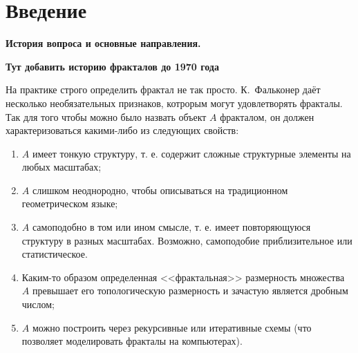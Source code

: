 \chapter*{Введение}                         %



\begin{center}
\textbf{История вопроса и основные направления.}
\end{center}
{\bf Тут добавить историю фракталов до 1970 года}


На практике строго определить фрактал не так просто.
К.~Фальконер \cite{Fal} даёт несколько необязательных признаков, котрорым могут удовлетворять фракталы.
Так для того чтобы можно было назвать объект $A$ фракталом, он должен характеризоваться какими-либо из следующих свойств:

\begin{enumerate}
\item $A$ имеет тонкую структуру, т. е. содержит сложные структурные элементы на любых масштабах;
\item $A$ слишком неоднородно, чтобы описываться на традиционном геометрическом языке;
\item $A$ самоподобно в том или ином смысле, т. е. имеет повторяющуюся структуру в разных масштабах. Возможно, самоподобие приблизительное или статистическое.
\item Каким-то образом определенная <<фрактальная>> размерность множества $A$ превышает его топологическую размерность и зачастую является дробным числом;
\item $A$ можно построить через рекурсивные или итеративные схемы (что позволяет моделировать фракталы на компьютерах).
\end{enumerate}


